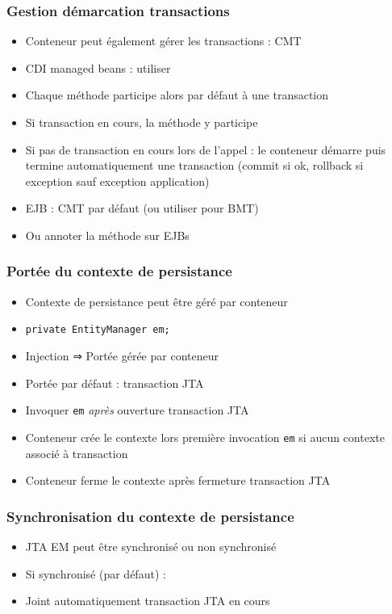 \documentclass[english, french]{beamer}
\begin{document}
\begin{frame}
	\frametitle{Gestion démarcation transactions}
	\begin{itemize}
		\item Conteneur peut également gérer les transactions : CMT
		\item CDI managed beans : utiliser 
		\item Chaque méthode participe alors par défaut à une transaction
		\item Si transaction en cours, la méthode y participe
		\item Si pas de transaction en cours lors de l’appel : le conteneur démarre puis termine automatiquement une transaction (commit si ok, rollback si exception {\tiny sauf exception application})
		\item EJB : CMT par défaut {\tiny (ou utiliser  pour BMT)}
		\item Ou annoter la méthode  sur EJBs
	\end{itemize}
\end{frame}

\begin{frame}
	\frametitle{Portée du contexte de persistance}
	\begin{itemize}
		\item Contexte de persistance peut être géré par conteneur
		\item {} \texttt{private EntityManager em;}
		\item Injection ⇒ Portée gérée par conteneur
		\item Portée par défaut : transaction JTA
		\item Invoquer \texttt{em} \emph{après} ouverture transaction JTA
		\item Conteneur crée le contexte lors première invocation \texttt{em} {\tiny si aucun contexte associé à transaction}
		\item Conteneur ferme le contexte après fermeture transaction JTA
	\end{itemize}
\end{frame}

\begin{frame}
	\frametitle{Synchronisation du contexte de persistance}
	\begin{itemize}
		\item JTA EM peut être synchronisé ou non synchronisé
		\item Si synchronisé (par défaut) :
		\item Joint automatiquement transaction JTA en cours
	\end{itemize}
\end{frame}
\end{document}
